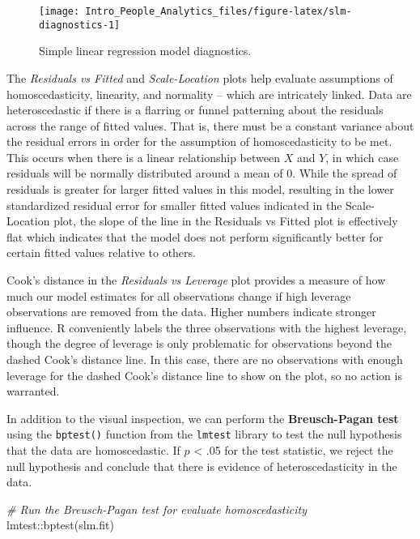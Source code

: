 \documentclass[
]{book}
\newenvironment{Shaded}{\begin{snugshade}}{\end{snugshade}}
\newcommand{\CommentTok}[1]{\textcolor[rgb]{0.56,0.35,0.01}{\textit{#1}}}
\newcommand{\FunctionTok}[1]{\textcolor[rgb]{0.00,0.00,0.00}{#1}}
\newcommand{\NormalTok}[1]{#1}
\newcommand{\SpecialCharTok}[1]{\textcolor[rgb]{0.00,0.00,0.00}{#1}}
\begin{document}
\begin{figure}

{\centering \texttt{[image: Intro\_People\_Analytics\_files/figure-latex/slm-diagnostics-1]} 

}

\caption{Simple linear regression model diagnostics.}\label{fig:slm-diagnostics}
\end{figure}

The \emph{Residuals vs Fitted} and \emph{Scale-Location} plots help evaluate assumptions of homoscedasticity, linearity, and normality -- which are intricately linked. Data are heteroscedastic if there is a flarring or funnel patterning about the residuals across the range of fitted values. That is, there must be a constant variance about the residual errors in order for the assumption of homoscedasticity to be met. This occurs when there is a linear relationship between \(X\) and \(Y\), in which case residuals will be normally distributed around a mean of 0. While the spread of residuals is greater for larger fitted values in this model, resulting in the lower standardized residual error for smaller fitted values indicated in the Scale-Location plot, the slope of the line in the Residuals vs Fitted plot is effectively flat which indicates that the model does not perform significantly better for certain fitted values relative to others.

Cook's distance in the \emph{Residuals vs Leverage} plot provides a measure of how much our model estimates for all observations change if high leverage observations are removed from the data. Higher numbers indicate stronger influence. R conveniently labels the three observations with the highest leverage, though the degree of leverage is only problematic for observations beyond the dashed Cook's distance line. In this case, there are no observations with enough leverage for the dashed Cook's distance line to show on the plot, so no action is warranted.

In addition to the visual inspection, we can perform the \textbf{Breusch-Pagan test} using the \texttt{bptest()} function from the \texttt{lmtest} library to test the null hypothesis that the data are homoscedastic. If \(p\) \textless{} .05 for the test statistic, we reject the null hypothesis and conclude that there is evidence of heteroscedasticity in the data.

\begin{Shaded}
\begin{Highlighting}[]
\CommentTok{\# Run the Breusch{-}Pagan test for evaluate homoscedasticity}
\NormalTok{lmtest}\SpecialCharTok{::}\FunctionTok{bptest}\NormalTok{(slm.fit)}
\end{Highlighting}
\end{Shaded}
\end{document}
